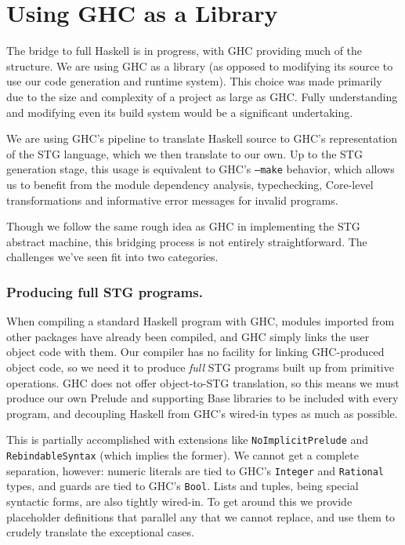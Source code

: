 \documentclass{llncs}
\begin{document}
\section{Using GHC as a Library}
\label{app:ghclibrary}

The bridge to full Haskell is in progress, with GHC providing much of
the structure.  We are using GHC as a library (as opposed to modifying
its source to use our code generation and runtime system).  This
choice was made primarily due to the size and complexity of a project
as large as GHC.  Fully understanding and modifying even its build
system would be a significant undertaking.

We are using GHC's pipeline to translate Haskell source to GHC's
representation of the STG language, which we then translate to our
own.  Up to the STG generation stage, this usage is equivalent to
GHC's \texttt{--make} behavior, which allows us to benefit from the
module dependency analysis, typechecking, Core-level transformations
and informative error messages for invalid programs.

Though we follow the same rough idea as GHC in implementing the STG
abstract machine, this bridging process is not entirely
straightforward.  The challenges we've seen fit into two categories.

\subsubsection{Producing full STG programs.}
When compiling a standard Haskell program with GHC, modules imported
from other packages have already been compiled, and GHC simply links
the user object code with them.  Our compiler has no facility for
linking GHC-produced object code, so we need it to produce
\textit{full}\/ STG programs built up from primitive operations.  GHC
does not offer object-to-STG translation, so this means we must
produce our own Prelude and supporting Base libraries to be included
with every program, and decoupling Haskell from GHC's wired-in types
as much as possible.

This is partially accomplished with extensions like
\texttt{NoImplicitPrelude} and \texttt{RebindableSyntax} (which
implies the former).  We cannot get a complete separation, however:
numeric literals are tied to GHC's \texttt{Integer} and
\texttt{Rational} types, and guards are tied to GHC's \texttt{Bool}.
Lists and tuples, being special syntactic forms, are also tightly
wired-in. To get around this we provide placeholder definitions that
parallel any that we cannot replace, and use them to crudely translate
the exceptional cases.
\end{document}
